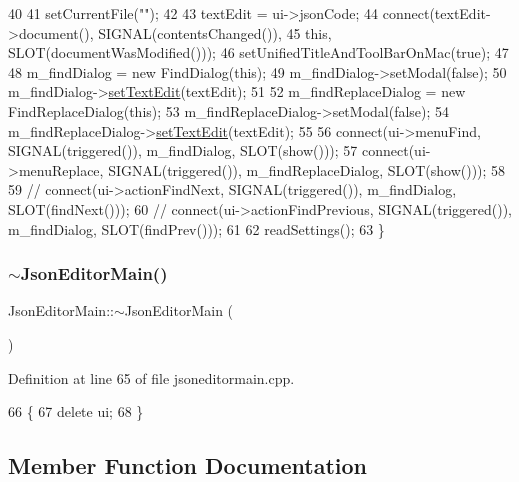 \begin{DoxyCode}
40 
41     setCurrentFile(\textcolor{stringliteral}{""});
42 
43     textEdit = ui->jsonCode;
44     connect(textEdit->document(), SIGNAL(contentsChanged()),
45             \textcolor{keyword}{this}, SLOT(documentWasModified()));
46     setUnifiedTitleAndToolBarOnMac(\textcolor{keyword}{true});
47 
48     m\_findDialog = \textcolor{keyword}{new} FindDialog(\textcolor{keyword}{this});
49     m\_findDialog->setModal(\textcolor{keyword}{false});
50     m\_findDialog->\hyperlink{class_ui_1_1_find_replace_dialog_a3d3cd91477be5d6529e9aa3de21958a6}{setTextEdit}(textEdit);
51 
52     m\_findReplaceDialog = \textcolor{keyword}{new} FindReplaceDialog(\textcolor{keyword}{this});
53     m\_findReplaceDialog->setModal(\textcolor{keyword}{false});
54     m\_findReplaceDialog->\hyperlink{class_ui_1_1_find_replace_dialog_a3d3cd91477be5d6529e9aa3de21958a6}{setTextEdit}(textEdit);
55 
56     connect(ui->menuFind, SIGNAL(triggered()), m\_findDialog, SLOT(show()));
57     connect(ui->menuReplace, SIGNAL(triggered()), m\_findReplaceDialog, SLOT(show()));
58 
59 \textcolor{comment}{//    connect(ui->actionFindNext, SIGNAL(triggered()), m\_findDialog, SLOT(findNext()));}
60 \textcolor{comment}{//    connect(ui->actionFindPrevious, SIGNAL(triggered()), m\_findDialog, SLOT(findPrev()));}
61 
62     readSettings();
63 \}
\end{DoxyCode}
\mbox{\label{class_json_editor_main_a6ed414b7f5f19c6c971053a5a8e83c3a}} 
\subsubsection{\texorpdfstring{$\sim$\+Json\+Editor\+Main()}{~JsonEditorMain()}}
{\footnotesize\ttfamily Json\+Editor\+Main\+::$\sim$\+Json\+Editor\+Main (\begin{DoxyParamCaption}{ }\end{DoxyParamCaption})}



Definition at line 65 of file jsoneditormain.\+cpp.


\begin{DoxyCode}
66 \{
67     \textcolor{keyword}{delete} ui;
68 \}
\end{DoxyCode}


\subsection{Member Function Documentation}
\mbox{\label{class_json_editor_main_a8242322e2557b45ff878ba77bbcc26d9}} 
